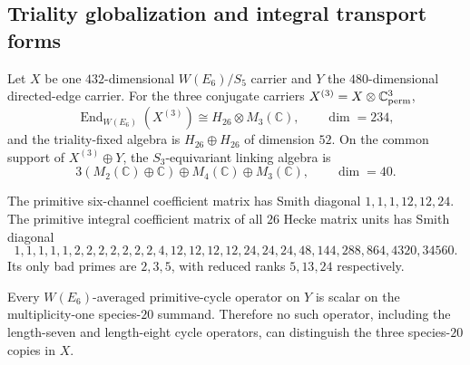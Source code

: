 \makeatletter
{}
\makeatother
\providecommand{\PSp}{\mathrm{PSp}}
\providecommand{\Aut}{\mathrm{Aut}}
\providecommand{\spec}{\operatorname{spec}}


\subsection{Triality globalization and integral transport forms}
\begin{theorem}
Let $X$ be one $432$-dimensional $W(E_6)/S_5$ carrier and $Y$ the
$480$-dimensional directed-edge carrier.  For the three conjugate carriers
$X^{(3)}=X\otimes\mathbb C^3_{\rm perm}$,
\[
 \operatorname{End}_{W(E_6)}(X^{(3)})\cong H_{26}\otimes M_3(\mathbb C),
 \qquad \dim=234,
\]
and the triality-fixed algebra is $H_{26}\oplus H_{26}$ of dimension $52$.
On the common support of $X^{(3)}\oplus Y$, the $S_3$-equivariant linking
algebra is
\[
 3(M_2(\mathbb C)\oplus\mathbb C)\oplus M_4(\mathbb C)\oplus M_3(\mathbb C),
 \qquad \dim=40.
\]
\end{theorem}
\begin{theorem}
The primitive six-channel coefficient matrix has Smith diagonal
$1,1,1,12,12,24$.  The primitive integral coefficient matrix of all $26$
Hecke matrix units has Smith diagonal
\[
1,1,1,1,1,2,2,2,2,2,2,2,4,12,12,12,12,24,24,24,48,144,288,864,4320,34560.
\]
Its only bad primes are $2,3,5$, with reduced ranks $5,13,24$ respectively.
\end{theorem}
\begin{corollary}
Every $W(E_6)$-averaged primitive-cycle operator on $Y$ is scalar on the
multiplicity-one species-$20$ summand.  Therefore no such operator, including
the length-seven and length-eight cycle operators, can distinguish the three
species-$20$ copies in $X$.
\end{corollary}
